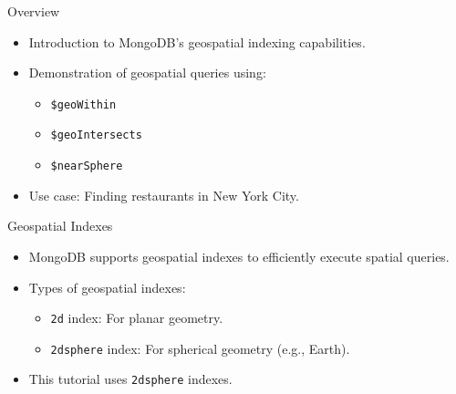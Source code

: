 \documentclass[aspectratio=169]{beamer}
\begin{document}

\begin{frame}{Overview}
	\begin{itemize}
		\item Introduction to MongoDB's geospatial indexing capabilities.
		\item Demonstration of geospatial queries using:
			\begin{itemize}
				\item \texttt{\$geoWithin}
				\item \texttt{\$geoIntersects}
				\item \texttt{\$nearSphere}
			\end{itemize}
		\item Use case: Finding restaurants in New York City.
	\end{itemize}
\end{frame}

\begin{frame}{Geospatial Indexes}
	\begin{itemize}
		\item MongoDB supports geospatial indexes to efficiently execute spatial queries.
		\item Types of geospatial indexes:
			\begin{itemize}
				\item \texttt{2d} index: For planar geometry.
				\item \texttt{2dsphere} index: For spherical geometry (e.g., Earth).
			\end{itemize}
		\item This tutorial uses \texttt{2dsphere} indexes.
	\end{itemize}
\end{frame}
\end{document}
